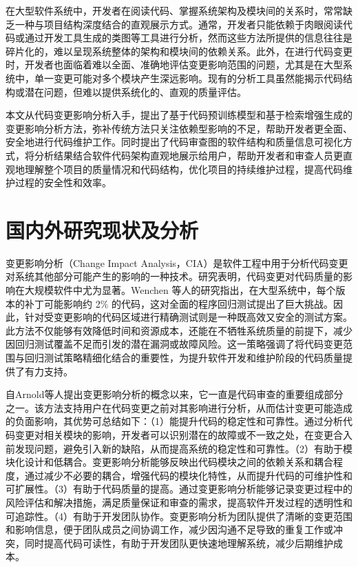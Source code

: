 在大型软件系统中，开发者在阅读代码、掌握系统架构及模块间的关系时，常常缺乏一种与项目结构深度结合的直观展示方式。通常，开发者只能依赖于肉眼阅读代码或通过开发工具生成的类图等工具进行分析，然而这些方法所提供的信息往往是碎片化的，难以呈现系统整体的架构和模块间的依赖关系。此外，在进行代码变更时，开发者也面临着难以全面、准确地评估变更影响范围的问题，尤其是在大型系统中，单一变更可能对多个模块产生深远影响。现有的分析工具虽然能揭示代码结构或潜在问题，但难以提供系统化的、直观的质量评估。

本文从代码变更影响分析入手，提出了基于代码预训练模型和基于检索增强生成的变更影响分析方法，弥补传统方法只关注依赖型影响的不足，帮助开发者更全面、安全地进行代码维护工作。同时提出了代码审查图的软件结构和质量信息可视化方式，将分析结果结合软件代码架构直观地展示给用户，帮助开发者和审查人员更直观地理解整个项目的质量情况和代码结构，优化项目的持续维护过程，提高代码维护过程的安全性和效率。


\section{国内外研究现状及分析}

变更影响分析（Change Impact Analysis，CIA）是软件工程中用于分析代码变更对系统其他部分可能产生的影响的一种技术。研究表明，代码变更对代码质量的影响在大规模软件中尤为显著。Wenchen 等人的研究指出\cite{2013Large}，在大型系统中，每个版本的补丁可能影响约 2\% 的代码，这对全面的程序回归测试提出了巨大挑战。因此，针对受变更影响的代码区域进行精确测试则是一种既高效又安全的测试方案。此方法不仅能够有效降低时间和资源成本，还能在不牺牲系统质量的前提下，减少因回归测试覆盖不足而引发的潜在漏洞或故障风险。这一策略强调了将代码变更范围与回归测试策略精细化结合的重要性，为提升软件开发和维护阶段的代码质量提供了有力支持。

自Arnold等人\cite{Arnold1996}提出变更影响分析的概念以来，它一直是代码审查的重要组成部分之一。该方法支持用户在代码变更之前对其影响进行分析，从而估计变更可能造成的负面影响，其优势可总结如下：（1）能提升代码的稳定性和可靠性。通过分析代码变更对相关模块的影响，开发者可以识别潜在的故障或不一致之处，在变更合入前发现问题，避免引入新的缺陷，从而提高系统的稳定性和可靠性。（2）有助于模块化设计和低耦合。变更影响分析能够反映出代码模块之间的依赖关系和耦合程度，通过减少不必要的耦合，增强代码的模块化特性，从而提升代码的可维护性和可扩展性。（3）有助于代码质量的提高。通过变更影响分析能够记录变更过程中的风险评估和解决措施，满足质量保证和审查的需求，提高软件开发过程的透明性和可追踪性。（4）有助于开发团队协作。变更影响分析为团队提供了清晰的变更范围和影响信息，便于团队成员之间协调工作，减少因沟通不足导致的重复工作或冲突，同时提高代码可读性，有助于开发团队更快速地理解系统，减少后期维护成本。

